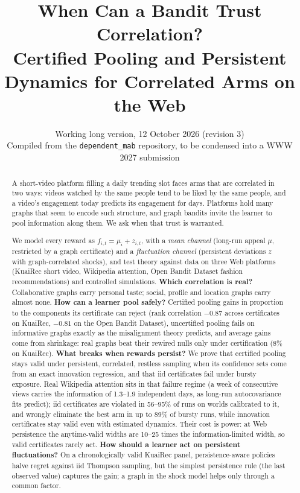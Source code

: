 \documentclass[11pt]{article}
\title{When Can a Bandit Trust Correlation?\\[2pt]
\large Certified Pooling and Persistent Dynamics for Correlated Arms on the Web}
\author{Working long version, 12 October 2026 (revision 3)\\
\small Compiled from the \texttt{dependent\_mab} repository, to be condensed into a WWW 2027 submission}
\date{}
\theoremstyle{definition}
\theoremstyle{remark}
\begin{document}
\maketitle

\begin{abstract}
A short-video platform filling a daily trending slot faces arms that are correlated in two ways: videos watched by the same people tend to be liked by the same people, and a video's engagement today predicts its engagement for days. Platforms hold many graphs that seem to encode such structure, and graph bandits invite the learner to pool information along them. We ask when that trust is warranted.

We model every reward as $f_{i,t}=\mu_i+z_{i,t}$, with a \emph{mean channel} (long-run appeal $\mu$, restricted by a graph certificate) and a \emph{fluctuation channel} (persistent deviations $z$ with graph-correlated shocks), and test theory against data on three Web platforms (KuaiRec short video, Wikipedia attention, Open Bandit Dataset fashion recommendations) and controlled simulations. \textbf{Which correlation is real?} Collaborative graphs carry personal taste; social, profile and location graphs carry almost none. \textbf{How can a learner pool safely?} Certified pooling gains in proportion to the components its certificate can reject (rank correlation $-0.87$ across certificates on KuaiRec, $-0.81$ on the Open Bandit Dataset), uncertified pooling fails on informative graphs exactly as the misalignment theory predicts, and average gains come from shrinkage: real graphs beat their rewired nulls only under certification (8\% on KuaiRec). \textbf{What breaks when rewards persist?} We prove that certified pooling stays valid under persistent, correlated, restless sampling when its confidence sets come from an exact innovation regression, and that iid certificates fail under bursty exposure. Real Wikipedia attention sits in that failure regime (a week of consecutive views carries the information of 1.3--1.9 independent days, as long-run autocovariance fits predict); iid certificates are violated in 56--95\% of runs on worlds calibrated to it, and wrongly eliminate the best arm in up to 89\% of bursty runs, while innovation certificates stay valid even with estimated dynamics. Their cost is power: at Web persistence the anytime-valid widths are 10--25 times the information-limited width, so valid certificates rarely act. \textbf{How should a learner act on persistent fluctuations?} On a chronologically valid KuaiRec panel, persistence-aware policies halve regret against iid Thompson sampling, but the simplest persistence rule (the last observed value) captures the gain; a graph in the shock model helps only through a common factor.
\end{abstract}
\end{document}
